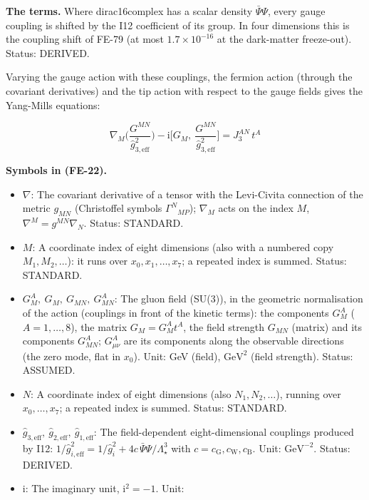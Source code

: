 \documentclass[
  10pt,
]{article}
\providecommand{\tightlist}{%
  \setlength{\itemsep}{0pt}\setlength{\parskip}{0pt}}
\begin{document}
\textbf{The terms.} Where dirac16complex has a scalar density
\(\bar\Psi\Psi\), every gauge coupling is shifted by the I12 coefficient
of its group. In four dimensions this is the coupling shift of FE-79 (at
most \(1.7\times10^{-16}\) at the dark-matter freeze-out). Status:
DERIVED.

Varying the gauge action with these couplings, the fermion action
(through the covariant derivatives) and the tip action with respect to
the gauge fields gives the Yang-Mills equations:

\[
\nabla_M\Big(\frac{G^{MN}}{\hat g_{3,\mathrm{eff}}^2}\Big) - \mathrm{i}\Big[G_M,\ \frac{G^{MN}}{\hat
 g_{3,\mathrm{eff}}^2}\Big]
 = J_3^{AN}\,t^A \tag{FE-22}
\]

\textbf{Symbols in (FE-22).}

\begin{itemize}
\tightlist
\item
  \(\nabla\): The covariant derivative of a tensor with the Levi-Civita
  connection of the metric \(g_{MN}\) (Christoffel symbols
  \(\Gamma^N{}_{MP}\)); \(\nabla_M\) acts on the index \(M\),
  \(\nabla^M = g^{MN}\nabla_N\). Status: STANDARD.
\item
  \(M\): A coordinate index of eight dimensions (also with a numbered
  copy \(M_1, M_2, \dots\)): it runs over \(x_0, x_1, \dots, x_7\); a
  repeated index is summed. Status: STANDARD.
\item
  \(G^A_M,\ G_M,\ G_{MN},\ G^A_{MN}\): The gluon field (SU(3)), in the
  geometric normalisation of the action (couplings in front of the
  kinetic terms): the components \(G^A_M\) (\(A = 1, \dots, 8\)), the
  matrix \(G_M = G^A_Mt^A\), the field strength \(G_{MN}\) (matrix) and
  its components \(G^A_{MN}\); \(G^A_{\mu\nu}\) are its components along
  the observable directions (the zero mode, flat in \(x_0\)). Unit: GeV
  (field), \(\mathrm{GeV}^{2}\) (field strength). Status: ASSUMED.
\item
  \(N\): A coordinate index of eight dimensions (also
  \(N_1, N_2, \dots\)), running over \(x_0, \dots, x_7\); a repeated
  index is summed. Status: STANDARD.
\item
  \(\hat g_{3,\mathrm{eff}},\ \hat g_{2,\mathrm{eff}},\ \hat g_{1,\mathrm{eff}}\):
  The field-dependent eight-dimensional couplings produced by I12:
  \(1/\hat g_{i,\mathrm{eff}}^2 = 1/\hat g_i^2 + 4c\,\bar\Psi\Psi/\Lambda_\star^3\)
  with \(c = c_{\mathrm{G}}, c_{\mathrm{W}}, c_{\mathrm{B}}\). Unit:
  \(\mathrm{GeV}^{-2}\). Status: DERIVED.
\item
  \(\mathrm{i}\): The imaginary unit, \(\mathrm{i}^2 = -1\). Unit:

\end{itemize}
\end{document}
